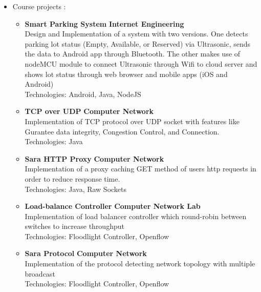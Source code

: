 \documentclass[a4paper,10pt]{article} %
\begin{document}
\begin{itemize}
	\item \textcolor{blue(ryb)}{Course projects} :
	\begin{itemize}
		\item
			\textbf{Smart Parking System} \hfill \textbf{Internet Engineering} \\
			Design and Implementation of a system with two versions. One detects parking lot status (Empty, Available, or Reserved) via Ultrasonic, sends the data to Android app through Bluetooth. The other makes use of nodeMCU module to connect Ultrasonic through Wifi to cloud server and shows lot status through web browser and mobile apps (iOS and Android) \\
			Technologies: Android, Java, NodeJS 
		
		\item
			\textbf{TCP over UDP} \hfill \textbf {Computer Network} \\
			Implementation of TCP protocol over UDP socket with features like Gurantee data integrity, Congestion Control, and Connection.\\
			Technologies: Java
			
			
		\item
			\textbf {Sara HTTP Proxy} \hfill \textbf {Computer Network} \\
			Implementation of a proxy caching GET method of users http requests in order to reduce response time. \\
			Technologies: Java, Raw Sockets
		
		\item
			\textbf{Load-balance Controller} \hfill \textbf {Computer Network Lab} \\
			Implementation of load balancer controller which round-robin between switches to increase throughput \\
			Technologies: Floodlight Controller, Openflow
			
		\item
			\textbf{Sara Protocol} \hfill \textbf {Computer Network} \\
			Implementation of the protocol detecting network topology with multiple broadcast \\
			Technologies: Floodlight Controller, Openflow
		

\end{itemize}
\end{itemize}
\end{document}

